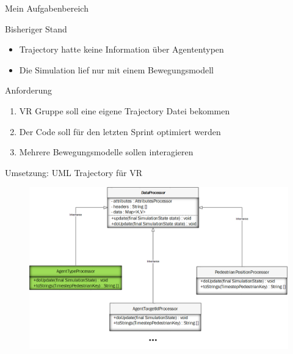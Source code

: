 \begin{frame}{Mein Aufgabenbereich}
\begin{minipage}{0.5\textwidth}
\begin{figure}[H]
			\end{figure}
	\end{minipage}
\end{frame}

\begin{frame}{Bisheriger Stand}
	\begin{itemize}
		\item Trajectory hatte keine Information über Agententypen
		\item Die Simulation lief nur mit einem Bewegungsmodell \cite{zarnitz-2015}
	\end{itemize}
\end{frame}

\begin{frame}{Anforderung}
	\begin{enumerate}
		\item VR Gruppe soll eine eigene Trajectory Datei bekommen
		\item Der Code soll für den letzten Sprint optimiert werden
		\item Mehrere Bewegungsmodelle sollen interagieren
	\end{enumerate}
\end{frame}

\begin{frame}{Umsetzung: UML Trajectory für VR}
	\begin{figure}
		\includegraphics[width=\textwidth, keepaspectratio]{appendix/uml/OutputProcessor.png}
	\end{figure}
\end{frame}

